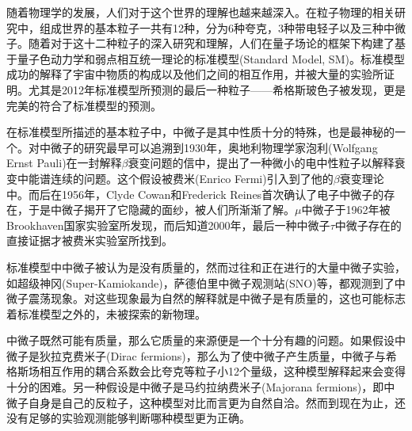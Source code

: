 

随着物理学的发展，人们对于这个世界的理解也越来越深入。在粒子物理的相关研究中，组成世界的基本粒子一共有12种，分为6种夸克，3种带电轻子以及三种中微子。随着对于这十二种粒子的深入研究和理解，人们在量子场论的框架下构建了基于量子色动力学和弱点相互统一理论的标准模型(Standard Model, SM)。标准模型成功的解释了宇宙中物质的构成以及他们之间的相互作用，并被大量的实验所证明。尤其是2012年标准模型所预测的最后一种粒子——希格斯玻色子被发现，更是完美的符合了标准模型的预测。

在标准模型所描述的基本粒子中，中微子是其中性质十分的特殊，也是最神秘的一个。对中微子的研究最早可以追溯到1930年，奥地利物理学家泡利(Wolfgang Ernst Pauli)在一封解释$\beta$衰变问题的信中，提出了一种微小的电中性粒子以解释衰变中能谱连续的问题。这个假设被费米(Enrico Fermi)引入到了他的$\beta$衰变理论中\supercite{wilson1968fermi}。而后在1956年，Clyde Cowan和Frederick Reines首次确认了电子中微子的存在\supercite{cowan1991detection}，于是中微子揭开了它隐藏的面纱，被人们所渐渐了解。$\mu$中微子于1962年被Brookhaven国家实验室所发现\supercite{danby1962observation}，而后知道2000年，最后一种中微子$\tau$中微子存在的直接证据才被费米实验室所找到\supercite{kodama2001observation}。

标准模型中中微子被认为是没有质量的，然而过往和正在进行的大量中微子实验，如超级神冈(Super-Kamiokande)\supercite{fukuda1998evidence}，萨德伯里中微子观测站(SNO)\supercite{ahmad2002direct}等，都观测到了中微子震荡现象。对这些现象最为自然的解释就是中微子是有质量的，这也可能标志着标准模型之外的，未被探索的新物理。

中微子既然可能有质量，那么它质量的来源便是一个十分有趣的问题。如果假设中微子是狄拉克费米子(Dirac fermions)，那么为了使中微子产生质量，中微子与希格斯场相互作用的耦合系数会比夸克等粒子小12个量级，这种模型解释起来会变得十分的困难。另一种假设是中微子是马约拉纳费米子(Majorana fermions)，即中微子自身是自己的反粒子，这种模型对比而言更为自然自洽。然而到现在为止，还没有足够的实验观测能够判断哪种模型更为正确。


